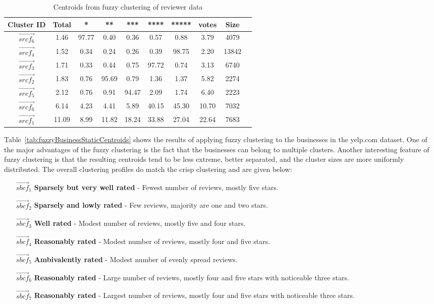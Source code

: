 \documentclass[oribibl]{llncs}
\begin{document}
\begin{table*}[h]
	\caption{Centroids from fuzzy clustering of reviewer data }
\centering
\small
{\setlength{\tabcolsep}{0.1cm}
\begin{tabular}{|c|c|c|c|c|c|c|c|c|c|}
\hline
Cluster ID&Total&*&**&***&****&*****&votes& Size\\
\hline
$\vec{srcf_6}$&1.46&97.77&0.40&0.36&0.57&0.88&3.79&4079\\
\hline
$\vec{srcf_4}$&1.52&0.34&0.24&0.26&0.39&98.75&2.20&13842\\
\hline
$\vec{srcf_3}$&1.71&0.33&0.44&0.75&97.72&0.74&3.13&6740\\
\hline
$\vec{srcf_2}$&1.83&0.76&95.69&0.79&1.36&1.37&5.82&2274\\
\hline
$\vec{srcf_5}$&2.12&0.76&0.91&94.47&2.09&1.74&6.40&2223\\
\hline
$\vec{srcf_6}$&6.14&4.23&4.41&5.89&40.15&45.30&10.70&7032\\
\hline
$\vec{srcf_1}$&11.09&8.99&11.82&18.24&33.88&27.04&22.64&7683\\
\hline
\end{tabular}}
\label{tab:fuzzyReviewerStaticCentroids} 
\end{table*}
Table~\ref{tab:fuzzyBusinessStaticCentroids} shows the results of applying fuzzy clustering to the businesses in the yelp.com dataset.
One of the major advantages of the fuzzy clustering is the fact that the businesses can belong to multiple clusters. Another interesting feature of fuzzy clustering is that the resulting centroids tend to be less extreme, better separated, and the cluster sizes are more uniformly distributed. The overall clustering profiles do match the crisp clustering and are given below:

\begin{itemize}
\item [$\vec{sbcf}_1$] {\bf Sparsely but very well rated} - Fewest number of reviews, mostly five stars.
\item [$\vec{sbcf}_2$] {\bf Sparsely and lowly rated} - Few reviews, majority are one and two stars.
\item [$\vec{sbcf}_3$] {\bf Well rated} - Modest number of reviews, mostly five and four stars.
\item [$\vec{sbcf}_4$] {\bf Reasonably rated} - Modest number of reviews, mostly four and five stars.
\item [$\vec{sbcf}_5$] {\bf Ambivalently rated} - Modest number of evenly spread reviews.
\item [$\vec{sbcf}_6$] {\bf Reasonably rated} - Large number of reviews, mostly four and five stars with noticeable three stars.
\item [$\vec{sbcf}_7$] {\bf Reasonably rated} - Largest number of reviews, mostly four and five stars with noticeable three stars.
\end{itemize}
\end{document}
